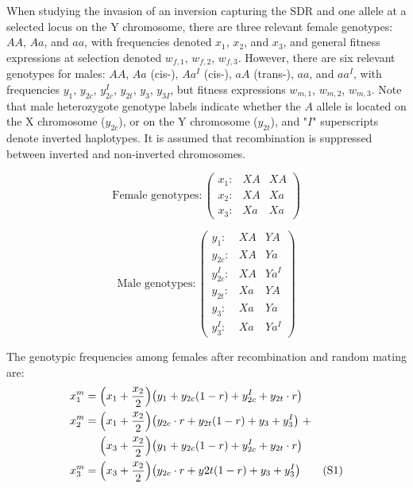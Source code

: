 \documentclass{article}
\newcommand\numberthis{\addtocounter{equation}{1}\tag{\theequation}}
\begin{document}
When studying the invasion of an inversion capturing the SDR and one allele at a selected locus on the Y chromosome, there are three relevant female genotypes: $AA$, $Aa$, and $aa$, with frequencies denoted $x_1$, $x_2$, and $x_3$, and general fitness expressions at selection denoted $w_{f,1}$, $w_{f,2}$, $w_{f,3}$. However, there are six relevant genotypes for males: $AA$, $Aa$ (cis-), $Aa^I$ (cis-), $aA$ (trans-), $aa$, and $aa^I$, with frequencies $y_{1}$, $y_{2c}$, $y^I_{2c}$, $y_{2t}$, $y_{3}$, $y_{3I}$, but fitness expressions $w_{m,1}$, $w_{m,2}$, $w_{m,3}$. Note that male heterozygote genotype labels indicate whether the $A$ allele is located on the X chromosome ($y_{2c}$), or on the Y chromosome ($y_{2t}$), and "$I$" superscripts denote inverted haplotypes. It is assumed that recombination is suppressed between inverted and non-inverted chromosomes.

\begin{equation*}
	\text{Female genotypes}:\left( \begin{array}{cc|c}
		x_1: & XA & XA \\
		x_2: & XA & Xa \\
		x_3: & Xa & Xa 
	\end{array} \right)
\end{equation*}

\begin{equation*}
	\text{Male genotypes}:\left( \begin{array}{cc|c}
		y_1:     & XA & YA \\
		y_{2c}:   & XA & Ya \\
		y^I_{2c}: & XA & Ya^I \\
		y_{2t}:   & Xa & YA \\
		y_{3}:    & Xa & Ya \\
		y^I_{3}:  & Xa & Ya^I 
	\end{array} \right)
\end{equation*}

\noindent The genotypic frequencies among females after recombination and random mating are:
\begin{align*}
	x^m_{1} &= \Big( x_1 + \frac{x_2}{2} \Big) \big(y_1 + y_{2c}(1 - r) + y^I_{2c} + y_{2t} \cdot r \big) \\
	x^m_{2} &= \Big( x_1 + \frac{x_2}{2} \Big) \big( y_{2c} \cdot r + y_{2t}(1 - r) + y_3 + y^I_3 \big)~+ \\
	&~~~~\Big( x_3 + \frac{x_2}{2} \Big) \big( y_{1} + y_{2c}(1 - r) + y^I_{2c} + y_{2t} \cdot r \big)      \\
	x^m_{3} &= \Big( x_3 + \frac{x_2}{2} \Big) \big(y_{2c} \cdot r + y{2t}(1 - r) + y_{3} + y^I_3  \big) \numberthis
\end{align*}
\end{document}
